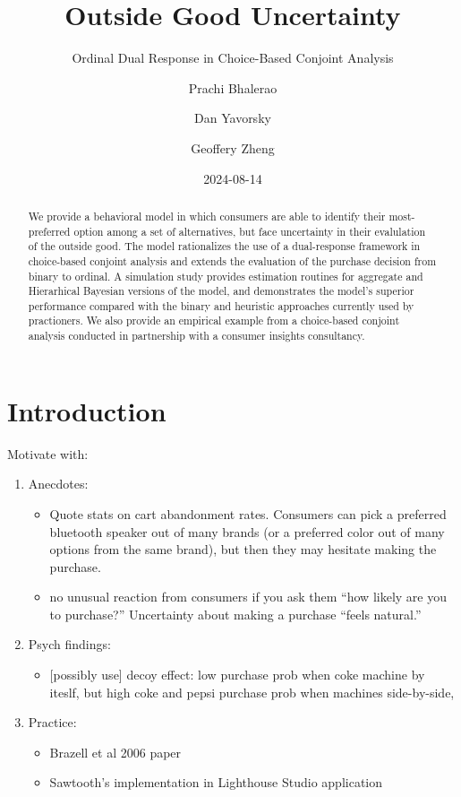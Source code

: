 \documentclass[
  letterpaper,
  DIV=11,
  numbers=noendperiod]{scrartcl}
\title{Outside Good Uncertainty}
\subtitle{Ordinal Dual Response in Choice-Based Conjoint Analysis}
\author{Prachi Bhalerao \and Dan Yavorsky \and Geoffery Zheng}
\date{2024-08-14}
\providecommand{\tightlist}{%
  \setlength{\itemsep}{0pt}\setlength{\parskip}{0pt}}\usepackage{longtable,booktabs,array}
\begin{document}
\maketitle
\begin{abstract}
We provide a behavioral model in which consumers are able to identify
their most-preferred option among a set of alternatives, but face
uncertainty in their evalulation of the outside good. The model
rationalizes the use of a dual-response framework in choice-based
conjoint analysis and extends the evaluation of the purchase decision
from binary to ordinal. A simulation study provides estimation routines
for aggregate and Hierarhical Bayesian versions of the model, and
demonstrates the model's superior performance compared with the binary
and heuristic approaches currently used by practioners. We also provide
an empirical example from a choice-based conjoint analysis conducted in
partnership with a consumer insights consultancy.
\end{abstract}


  \newcommand{\x}{\mathbf{x}}
  \newcommand{\bfbeta}{\boldsymbol{\beta}}
  \newcommand{\iid}{\stackrel{iid}{\sim}}

\section{Introduction}\label{sec-intro}

Motivate with:

\begin{enumerate}
\def\labelenumi{\arabic{enumi}.}
\item
  Anecdotes:

  \begin{itemize}
  \tightlist
  \item
    Quote stats on cart abandonment rates. Consumers can pick a
    preferred bluetooth speaker out of many brands (or a preferred color
    out of many options from the same brand), but then they may hesitate
    making the purchase.
  \item
    no unusual reaction from consumers if you ask them ``how likely are
    you to purchase?'' Uncertainty about making a purchase ``feels
    natural.''
  \end{itemize}
\item
  Psych findings:

  \begin{itemize}
  \tightlist
  \item
    {[}possibly use{]} decoy effect: low purchase prob when coke machine
    by iteslf, but high coke and pepsi purchase prob when machines
    side-by-side,
  \end{itemize}
\item
  Practice:

  \begin{itemize}
  \tightlist
  \item
    Brazell et al 2006 paper
  \item
    Sawtooth's implementation in Lighthouse Studio application
  \end{itemize}
\end{enumerate}
\end{document}
